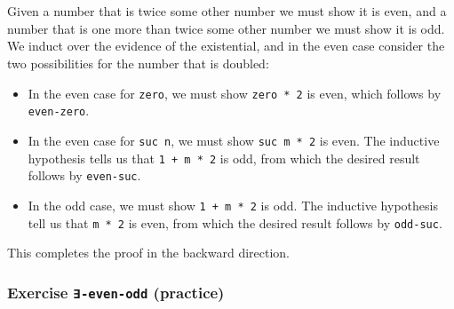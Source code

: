 \begin{fence}
\begin{code}
\AgdaSpace{}%
\AgdaOperator{\AgdaInductiveConstructor{,}}\AgdaSpace{}%
\AgdaSpace{}%
\AgdaSymbol{)}\<%
\\
%
\\[\AgdaEmptyExtraSkip]%
\>[0]%
\>[7]%
\>[13]\AgdaSpace{}%
\AgdaOperator{\AgdaInductiveConstructor{,}}\AgdaSpace{}%
\AgdaSpace{}%
%
\>[25]\AgdaSymbol{=}%
\>[28]\AgdaSpace{}%
\AgdaSymbol{(}\AgdaSpace{}%
\AgdaSpace{}%
\AgdaSpace{}%
\AgdaOperator{\AgdaInductiveConstructor{,}}\AgdaSpace{}%
\AgdaSpace{}%
\AgdaSymbol{)}\<%
\end{code}
\end{fence}

Given a number that is twice some other number we must show it is even,
and a number that is one more than twice some other number we must show
it is odd. We induct over the evidence of the existential, and in the
even case consider the two possibilities for the number that is doubled:

\begin{itemize}
\item
  In the even case for \texttt{zero}, we must show \texttt{zero\ *\ 2}
  is even, which follows by \texttt{even-zero}.
\item
  In the even case for \texttt{suc\ n}, we must show
  \texttt{suc\ m\ *\ 2} is even. The inductive hypothesis tells us that
  \texttt{1\ +\ m\ *\ 2} is odd, from which the desired result follows
  by \texttt{even-suc}.
\item
  In the odd case, we must show \texttt{1\ +\ m\ *\ 2} is odd. The
  inductive hypothesis tell us that \texttt{m\ *\ 2} is even, from which
  the desired result follows by \texttt{odd-suc}.
\end{itemize}

This completes the proof in the backward direction.

\hypertarget{exercise--even-odd-practice}{%
\subsubsection{\texorpdfstring{Exercise \texttt{∃-even-odd}
(practice)}{Exercise ∃-even-odd (practice)}}\label{exercise--even-odd-practice}}

